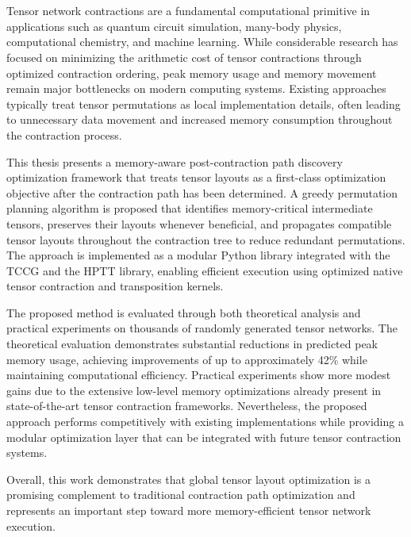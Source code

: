\chapter{\abstractname}

Tensor network contractions are a fundamental computational primitive in applications such as quantum circuit simulation, many-body physics, computational chemistry, and machine learning. While considerable research has focused on minimizing the arithmetic cost of tensor contractions through optimized contraction ordering, peak memory usage and memory movement remain major bottlenecks on modern computing systems. Existing approaches typically treat tensor permutations as local implementation details, often leading to unnecessary data movement and increased memory consumption throughout the contraction process.

This thesis presents a memory-aware post-contraction path discovery optimization framework that treats tensor layouts as a first-class optimization objective after the contraction path has been determined. A greedy permutation planning algorithm is proposed that identifies memory-critical intermediate tensors, preserves their layouts whenever beneficial, and propagates compatible tensor layouts throughout the contraction tree to reduce redundant permutations. The approach is implemented as a modular Python library integrated with the \ac{TCCG} and the \ac{HPTT} library, enabling efficient execution using optimized native tensor contraction and transposition kernels.

The proposed method is evaluated through both theoretical analysis and practical experiments on thousands of randomly generated tensor networks. The theoretical evaluation demonstrates substantial reductions in predicted peak memory usage, achieving improvements of up to approximately 42\% while maintaining computational efficiency. Practical experiments show more modest gains due to the extensive low-level memory optimizations already present in state-of-the-art tensor contraction frameworks. Nevertheless, the proposed approach performs competitively with existing implementations while providing a modular optimization layer that can be integrated with future tensor contraction systems.

Overall, this work demonstrates that global tensor layout optimization is a promising complement to traditional contraction path optimization and represents an important step toward more memory-efficient tensor network execution.
